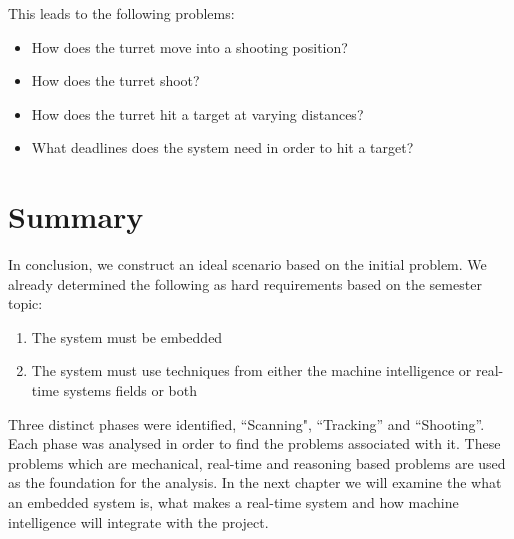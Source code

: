 This leads to the following problems:
\begin{itemize}
  \item How does the turret move into a shooting position?
  \item How does the turret shoot?
  \item How does the turret hit a target at varying distances?
  \item What deadlines does the system need in order to hit a target?
\end{itemize}

\section{Summary}
In conclusion, we construct an ideal scenario based on the initial problem. We
already determined the following as hard requirements based on the semester
topic:

\begin{enumerate}
	\item The system must be embedded
	\item The system must use techniques from either the machine intelligence or
	real-time systems fields or both
\end{enumerate}

Three distinct phases were identified, ``Scanning", ``Tracking'' and
``Shooting''. Each phase was analysed in order to find the problems associated
with it. These problems which are mechanical, real-time and reasoning based
problems are used as the foundation for the analysis. In the next chapter
we will examine the what an embedded system is, what makes a real-time system
and how machine intelligence will integrate with the project.

